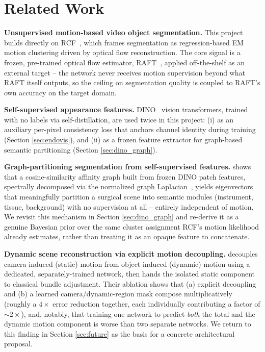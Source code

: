 \documentclass[conference]{IEEEtran}
\begin{document}
\section{Related Work}

\textbf{Unsupervised motion-based video object segmentation.} This
project builds directly on RCF~\cite{rcf_cvpr2023}, which frames
segmentation as regression-based EM motion clustering driven by optical
flow reconstruction. The core signal is a frozen, pre-trained optical
flow estimator, RAFT~\cite{raft_eccv2020}, applied off-the-shelf as an
external target -- the network never receives motion supervision beyond
what RAFT itself outputs, so the ceiling on segmentation quality is
coupled to RAFT's own accuracy on the target domain.

\textbf{Self-supervised appearance features.} DINO~\cite{dino_iccv2021}
vision transformers, trained with no labels via self-distillation, are
used twice in this project: (i) as an auxiliary per-pixel consistency
loss that anchors channel identity during training (Section
\ref{sec:endovis}), and (ii) as a frozen feature extractor for graph-based
semantic partitioning (Section \ref{sec:dino_graph}).

\textbf{Graph-partitioning segmentation from self-supervised features.}
\cite{graphpartition_mchm2024} shows that a cosine-similarity affinity
graph built from frozen DINO patch features, spectrally decomposed via
the normalized graph Laplacian~\cite{normalized_cuts}, yields eigenvectors
that meaningfully partition a surgical scene into semantic modules
(instrument, tissue, background) with no supervision at all -- entirely
independent of motion. We revisit this mechanism in Section
\ref{sec:dino_graph} and re-derive it as a genuine Bayesian prior over the
same cluster assignment RCF's motion likelihood already estimates,
rather than treating it as an opaque feature to concatenate.

\textbf{Dynamic scene reconstruction via explicit motion decoupling.}
\cite{batrack2025} decouples camera-induced (static) motion from
object-induced (dynamic) motion using a dedicated, separately-trained
network, then hands the isolated static component to classical bundle
adjustment. Their ablation shows that (a) explicit decoupling and (b) a
learned camera/dynamic-region mask compose multiplicatively (roughly a
$4\times$ error reduction together, each individually contributing a
factor of $\sim2\times$), and, notably, that training one network to
predict \emph{both} the total and the dynamic motion component is
worse than two separate networks. We return to this finding in Section
\ref{sec:future} as the basis for a concrete architectural proposal.
\end{document}
